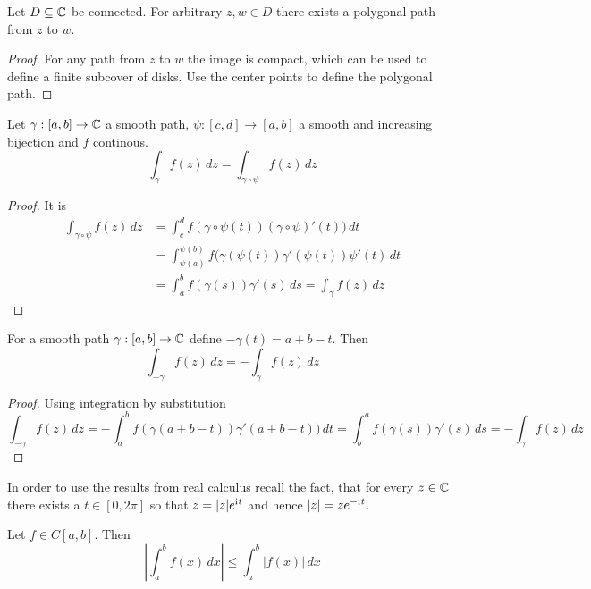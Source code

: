\begin{lemma}
	Let \( D \subseteq \mathbb{C} \) be connected. For arbitrary \( z, w \in D \) there exists a polygonal path from
	\( z \) to \( w \).
\end{lemma}
\begin{proof}
	For any path from \( z \) to \( w \) the image is compact, which can be used to define a finite subcover of disks.
	Use the center points to define the polygonal path.
\end{proof}
\bigskip


\begin{lemma}
	Let \( \gamma: [a,b] \to \mathbb{C} \) a smooth path, \( \psi: [c,d] \to [a,b] \) a smooth and increasing bijection
	and \( f \) continous.
	\[
		\int_{\gamma} f(z)\,dz = \int_{\gamma\circ\psi} f(z)\,dz
	\]
\end{lemma}

\begin{proof} It is
	\[
		\begin{split}
			\int_{\gamma\circ\psi} f(z)\,dz
			& = \int_c^d f(\gamma\circ\psi(t))(\gamma\circ\psi)'(t)) \,dt \\
			& = \int_{\psi(a)}^{\psi(b)} f(\gamma(\psi(t))\gamma'(\psi(t))\psi'(t) \,dt \\
			& = \int_a^b f(\gamma(s))\gamma'(s) \,ds = \int_{\gamma} f(z)\,dz
		\end{split}
	\]
\end{proof}
\bigskip


\begin{lemma}
	For a smooth path \( \gamma: [a,b] \to \mathbb{C} \) define \(-\gamma(t) = a + b - t \).
	Then
	\[
		\int_{-\gamma} f(z)\,dz = -\int_{\gamma} f(z)\,dz
	\]
\end{lemma}

\begin{proof} Using integration by substitution
	\[
		\int_{-\gamma} f(z)\,dz
		= - \int_a^b f(\gamma(a + b - t))\gamma'(a + b - t)) \,dt
		= \int_b^a f(\gamma(s))\gamma'(s) \,ds
		= - \int_{\gamma} f(z)\,dz
	\]
\end{proof}
\bigskip


In order to use the results from real calculus recall the fact, that for every \( z \in \mathbb{C} \)
there exists a \( t \in [0,2\pi] \) so that \( z = |z|e^{\mathrm{i}\mkern1mu t} \) and hence \( |z| = ze^{-\mathrm{i}\mkern1mu t} \).
\bigskip


\begin{lemma}
	Let \( f \in C[a,b] \). Then
	\[
		\left|\int_a^b f(x)\,dx \right| \le \int_a^b |f(x)|\,dx
	\]
\end{lemma}

